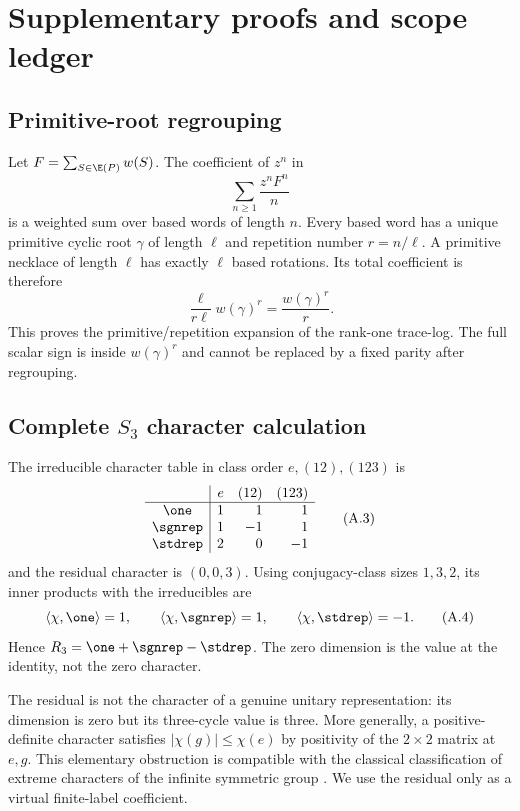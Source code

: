 \section{Supplementary proofs and scope ledger}
\label{app:proofs}

\subsection{Primitive-root regrouping}

Let $F=\sum_{S\in\E(P)}w(S)$.  The coefficient of $z^n$ in
\[
  \sum_{n\ge1}\frac{z^nF^n}{n}
  \tag{A.1}
\]
is a weighted sum over based words of length $n$.  Every based word has a
unique primitive cyclic root $\gamma$ of length $\ell$ and repetition number
$r=n/\ell$.  A primitive necklace of length $\ell$ has exactly $\ell$ based
rotations.  Its total coefficient is therefore
\[
  \frac{\ell}{r\ell}w(\gamma)^r
  =\frac{w(\gamma)^r}{r}.
  \tag{A.2}
\]
This proves the primitive/repetition expansion of the rank-one trace-log.
The full scalar sign is inside $w(\gamma)^r$ and cannot be replaced by a
fixed parity after regrouping.

\subsection{Complete \texorpdfstring{$S_3$}{S3} character calculation}

The irreducible character table in class order $e,(12),(123)$ is
\[
\begin{array}{c|rrr}
 & e & (12) & (123)\\ \hline
\one & 1&1&1\\
\sgnrep & 1&-1&1\\
\stdrep & 2&0&-1
\end{array}
\tag{A.3}
\]
and the residual character is $(0,0,3)$.  Using conjugacy-class sizes
$1,3,2$, its inner products with the irreducibles are
\[
 \langle\chi,\one\rangle=1,
 \qquad
 \langle\chi,\sgnrep\rangle=1,
 \qquad
 \langle\chi,\stdrep\rangle=-1.
 \tag{A.4}
\]
Hence $R_3=\one+\sgnrep-\stdrep$.  The zero dimension is the value at the
identity, not the zero character.

The residual is not the character of a genuine unitary representation: its
dimension is zero but its three-cycle value is three.  More generally, a
positive-definite character satisfies $|\chi(g)|\le\chi(e)$ by positivity of
the $2\times2$ matrix at $e,g$.  This elementary obstruction is compatible
with the classical classification of extreme characters of the infinite
symmetric group \citep{Thoma1964InfiniteSymmetric}.  We use the residual only
as a virtual finite-label coefficient.

